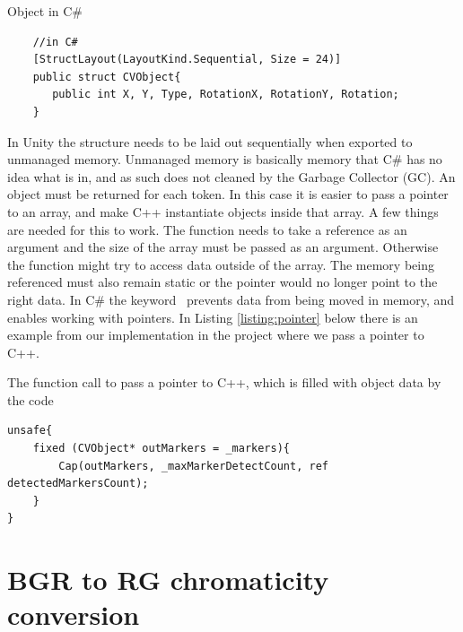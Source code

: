 \begin{listing}[H]
	\caption{Object in C\#}
	\label{listing:objects2}
	\begin{verbatim}
	//in C#	
	[StructLayout(LayoutKind.Sequential, Size = 24)]
	public struct CVObject{
	   public int X, Y, Type, RotationX, RotationY, Rotation;
	}
	\end{verbatim}
\end{listing}
In Unity the structure needs to be laid out sequentially when exported to unmanaged memory. Unmanaged memory is basically memory that C\# has no idea what is in, and as such does not cleaned by the Garbage Collector (GC). An object must be returned for each token. In this case it is easier to pass a pointer to an array, and make C++ instantiate objects inside that array. A few things are needed for this to work. The function needs to take a reference as an argument and the size of the array must be passed as an argument. Otherwise the function might try to access data outside of the array. The memory being referenced must also remain static or the pointer would no longer point to the right data. In C\# the keyword  prevents data from being moved in memory, and  enables working with pointers. In Listing \ref{listing:pointer} below there is an example from our implementation in the project where we pass a pointer to C++. %
\begin{listing}[H]
\caption{The function call to pass a pointer to C++, which is filled with object data by the code}
\label{listing:pointer}
\begin{verbatim}
unsafe{
	fixed (CVObject* outMarkers = _markers){
		Cap(outMarkers, _maxMarkerDetectCount, ref detectedMarkersCount);
	}
}
\end{verbatim}
\end{listing}


\section{BGR to RG chromaticity conversion}

